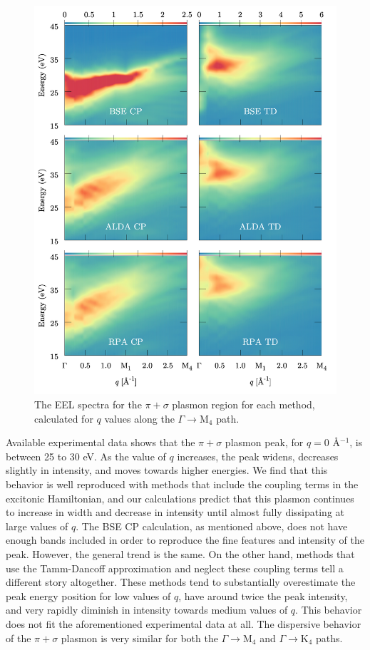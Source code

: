 \documentclass[aps,prb,10pt,showpacs,superscriptaddress,twocolumn,notitlepage]{revtex4-1}
\begin{document}
\begin{figure}[b]
\includegraphics[width=\linewidth]{fig09}
\caption{The EEL spectra for the $\pi + \sigma$ plasmon region for each method,
calculated for $q$ values along the $\Gamma \rightarrow \mathrm{M}_{4}$ path.}
\label{fig:gm-heatmap_hi}
\end{figure}

Available experimental data \cite{zeppenfeldZP71, buchnerPSSB77,
marinopoulosPRB04} shows that the $\pi + \sigma$ plasmon peak, for $q = 0$
\r{A}$^{-1}$, is between 25 to 30 eV. As the value of $q$ increases, the peak
widens, decreases slightly in intensity, and moves towards higher energies. We
find that this behavior is well reproduced with methods that include the
coupling terms in the excitonic Hamiltonian, and our calculations predict that
this plasmon continues to increase in width and decrease in intensity until
almost fully dissipating at large values of $q$. The BSE CP calculation, as
mentioned above, does not have enough bands included in order to reproduce the
fine features and intensity of the peak. However, the general trend is the same.
On the other hand, methods that use the Tamm-Dancoff approximation and neglect
these coupling terms tell a different story altogether. These methods tend to
substantially overestimate the peak energy position for low values of $q$, have
around twice the peak intensity, and very rapidly diminish in intensity towards
medium values of $q$. This behavior does not fit the aforementioned experimental
data at all. The dispersive behavior of the $\pi + \sigma$ plasmon is very
similar for both the $\Gamma \rightarrow \mathrm{M}_{4}$ and $\Gamma \rightarrow
\mathrm{K}_{4}$ paths.
\end{document}
